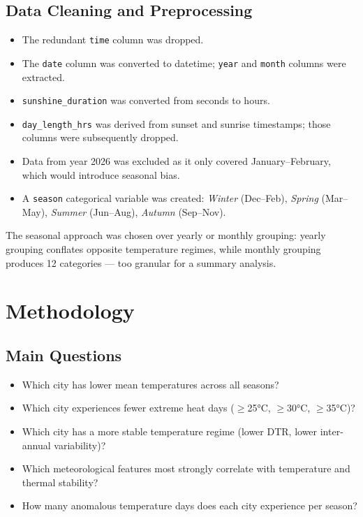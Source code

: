 \documentclass[11pt,a4paper]{article}
\begin{document}
\subsection{Data Cleaning and Preprocessing}

\begin{itemize}
  \item The redundant \texttt{time} column was dropped.
  \item The \texttt{date} column was converted to datetime; \texttt{year} and \texttt{month} columns were extracted.
  \item \texttt{sunshine\_duration} was converted from seconds to hours.
  \item \texttt{day\_length\_hrs} was derived from sunset and sunrise timestamps; those columns were subsequently dropped.
  \item Data from year 2026 was excluded as it only covered January–February, which would introduce seasonal bias.
  \item A \texttt{season} categorical variable was created: \textit{Winter} (Dec–Feb), \textit{Spring} (Mar–May), \textit{Summer} (Jun–Aug), \textit{Autumn} (Sep–Nov).
\end{itemize}

The seasonal approach was chosen over yearly or monthly grouping: yearly grouping conflates opposite temperature regimes, while monthly grouping produces 12 categories — too granular for a summary analysis.

\section{Methodology}

\subsection{Main Questions}

\begin{itemize}
  \item Which city has lower mean temperatures across all seasons?
  \item Which city experiences fewer extreme heat days ($\geq$25°C, $\geq$30°C, $\geq$35°C)?
  \item Which city has a more stable temperature regime (lower DTR, lower inter-annual variability)?
  \item Which meteorological features most strongly correlate with temperature and thermal stability?
  \item How many anomalous temperature days does each city experience per season?
\end{itemize}
\end{document}
